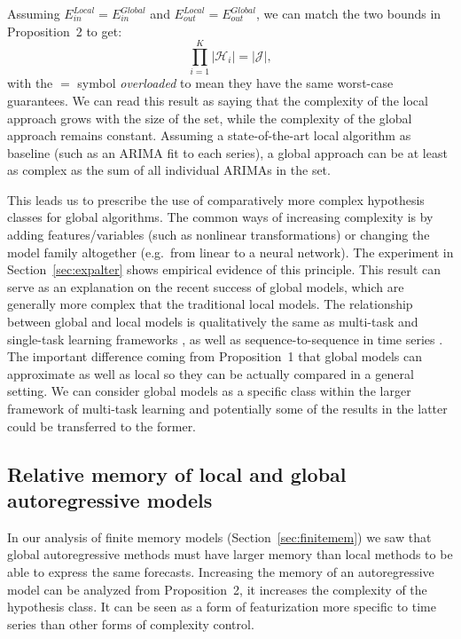 \documentclass[a4paper]{article}
\theoremstyle{custom}
\begin{document}
Assuming $E_{\textit{in}}^{\textit{Local}} = E_{\textit{in}}^{\textit{Global}}$ and $E_{\textit{out}}^{\textit{Local}} = E_{\textit{out}}^{\textit{Global}}$, we can match the two bounds in Proposition~2 to get:
$$
  \prod_{i=1}^K|\mathcal{H}_i |= |{\mathcal{J}}|,
$$
with the $=$ symbol \textit{overloaded} to mean they have the same worst-case guarantees.
We can read this result as saying that the complexity of the local approach grows with the size of the set, while the complexity of the global approach remains constant. Assuming a state-of-the-art local algorithm as baseline (such as an ARIMA fit to each series), a global approach can be at least as complex as the sum of all individual ARIMAs in the set. 

This leads us to prescribe the use of comparatively more complex hypothesis classes for global algorithms. The common ways of increasing complexity is by adding features/variables (such as nonlinear transformations) or changing the model family altogether (e.g.\ from linear to a neural network).
The experiment in Section~\ref{sec:expalter} shows empirical evidence of this principle. This result can serve as an explanation on the recent success of global models, which are generally more complex that the traditional local models. The relationship between global and local models is qualitatively the same as multi-task and single-task learning frameworks \cite{zhang2015multi}, as well as sequence-to-sequence in time series \cite{mariet2019foundations}. The important difference coming from Proposition~1 that global models can approximate as well as local so they can be actually compared in a general setting. We can consider global models as a specific class within the larger framework of multi-task learning and potentially some of the results in the latter could be transferred to the former.

\subsection{Relative memory of local and global autoregressive models}
\label{sec:largemem}

In our analysis of finite memory models (Section~\ref{sec:finitemem}) we saw that global autoregressive methods must have larger memory than local methods to be able to express the same forecasts. Increasing the memory of an autoregressive model can be analyzed from Proposition~2, it increases the complexity of the hypothesis class. It can be seen as a form of featurization more specific to time series than other forms of complexity control.
\end{document}
